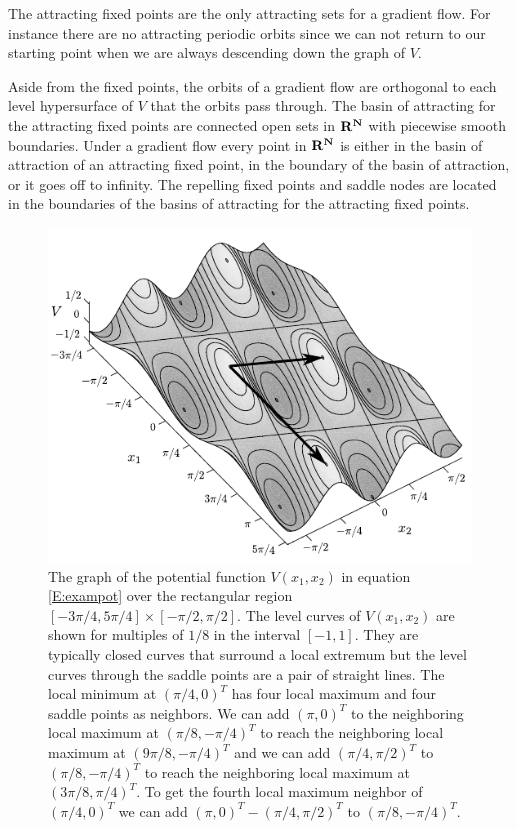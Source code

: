    The attracting fixed points are the only attracting sets for a gradient 
flow.  For instance there are no attracting periodic orbits since we can not 
return to our starting point when we are always descending down the graph of 
$V$.  

   Aside from the fixed points, the orbits of a gradient flow are orthogonal to
each level hypersurface of $V$ that the orbits pass through.  The basin of 
attracting for the attracting fixed points are connected open sets in $\bf{R}^N$ 
with piecewise smooth boundaries.  Under a gradient flow every point in 
$\bf{R}^N$ is either in the basin of attraction of an attracting fixed point, in
the boundary of the basin of attraction, or it goes off to infinity.  The 
repelling fixed points and saddle nodes are located in the boundaries of the 
basins of attracting for the attracting fixed points.  

\begin{figure}[ht]
\centering
\includegraphics[scale=1.20]{./images/Gradient1.pdf}
\caption{The graph of the potential function $V( x_1, x_2)$ in equation 
\eqref{E:exampot} over the rectangular region $[-3\pi/4,5\pi/4] \times 
[-\pi/2,\pi/2]$.  The level curves of $V( x_1, x_2)$ are shown for 
multiples of $1/8$ in the interval $[-1,1]$.  They are typically closed 
curves that surround a local extremum but the level curves through the saddle 
points are a pair of straight lines.  The local minimum at $(\pi/4,0)^T$ has 
four local maximum and four saddle points as neighbors.  We can add $(\pi,0)^T$
to the neighboring local maximum at $(\pi/8,-\pi/4)^T$ to reach the neighboring
local maximum at $(9\pi/8,-\pi/4)^T$ and we can add $(\pi/4,\pi/2)^T$ to 
$(\pi/8,-\pi/4)^T$ to reach the neighboring local maximum at 
$(3\pi/8,\pi/4)^T$.  To get the fourth local maximum neighbor of 
$(\pi/4,0)^T$ we can add $(\pi,0)^T - (\pi/4,\pi/2)^T$ to $(\pi/8,-\pi/4)^T$.}
\label{F:exampot}  
\end{figure}

